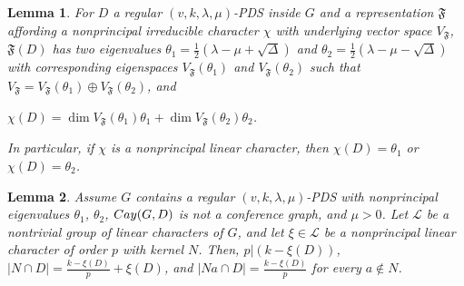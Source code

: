 \documentclass[10pt,a4paper]{amsart}
\newtheorem{lem}{Lemma}
\newcommand{\Cay}{{\rm Cay}}
\newcommand{\repF}{\mathfrak{F}}
\begin{document}
\begin{lem}\label{eigenvalues}
	For $D$ a regular $(v, k ,\lambda, \mu)$-PDS inside $G$ and a representation $\repF$ affording a nonprincipal irreducible character $\chi$ with underlying vector space $V_\repF$, $\repF(D)$ has two eigenvalues $\theta_1 = \frac12(\lambda-\mu + \sqrt{\Delta})$ and $\theta_2 = \frac12(\lambda-\mu - \sqrt{\Delta})$ with corresponding eigenspaces $V_\repF(\theta_1)$ and $V_\repF(\theta_2)$ such that $V_\repF = V_\repF(\theta_1) \oplus V_\repF(\theta_2)$, and
		\begin{center}
			$\chi(D) = \dim V_\repF(\theta_1)\theta_1 + \dim V_\repF(\theta_2)\theta_2$.
		\end{center}
	In particular, if $\chi$ is a nonprincipal linear character, then $\chi(D) = \theta_1$ or $\chi(D) = \theta_2$.
\end{lem}

	\begin{lem}\label{kernel-D}
		Assume $G$ contains a regular $(v, k, \lambda, \mu)$-PDS with nonprincipal eigenvalues $\theta_1$, $\theta_2$, $\Cay(G, D)$ is not a conference graph, and $\mu > 0$. Let $\mathcal{L}$ be a nontrivial group of linear characters of $G$, and let $\xi\in \mathcal{L}$ be a nonprincipal linear character of order $p$ with kernel $N$. Then, $p | (k-\xi(D))$, $|N\cap D| = \frac{k-\xi(D)}{p} + \xi(D)$, and $|Na \cap D| = \frac{k-\xi(D)}{p}$ for every $a \not \in N$.
	\end{lem}
\end{document}
